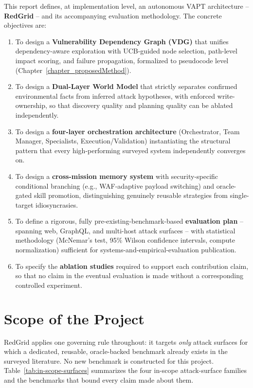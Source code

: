 This report defines, at implementation level, an autonomous VAPT architecture -- \textbf{RedGrid} -- and its accompanying evaluation methodology. The concrete objectives are:

\begin{enumerate}
    \item To design a \textbf{Vulnerability Dependency Graph (VDG)} that unifies dependency-aware exploration with UCB-guided node selection, path-level impact scoring, and failure propagation, formalized to pseudocode level (Chapter~\ref{chapter_proposedMethod}).
    \item To design a \textbf{Dual-Layer World Model} that strictly separates confirmed environmental facts from inferred attack hypotheses, with enforced write-ownership, so that discovery quality and planning quality can be ablated independently.
    \item To design a \textbf{four-layer orchestration architecture} (Orchestrator, Team Manager, Specialists, Execution/Validation) instantiating the structural pattern that every high-performing surveyed system independently converges on.
    \item To design a \textbf{cross-mission memory system} with security-specific conditional branching (e.g., WAF-adaptive payload switching) and oracle-gated skill promotion, distinguishing genuinely reusable strategies from single-target idiosyncrasies.
    \item To define a rigorous, fully pre-existing-benchmark-based \textbf{evaluation plan} -- spanning web, GraphQL, and multi-host attack surfaces -- with statistical methodology (McNemar's test, 95\% Wilson confidence intervals, compute normalization) sufficient for systems-and-empirical-evaluation publication.
    \item To specify the \textbf{ablation studies} required to support each contribution claim, so that no claim in the eventual evaluation is made without a corresponding controlled experiment.
\end{enumerate}

\section{Scope of the Project}
\label{sec:intro_scope}

RedGrid applies one governing rule throughout: it targets \emph{only} attack surfaces for which a dedicated, reusable, oracle-backed benchmark already exists in the surveyed literature. No new benchmark is constructed for this project. Table~\ref{tab:in-scope-surfaces} summarizes the four in-scope attack-surface families and the benchmarks that bound every claim made about them.

